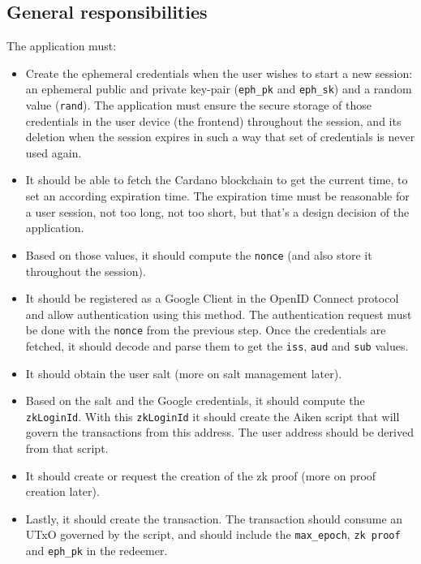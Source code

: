 \documentclass{article}
\begin{document}
\subsection{General responsibilities}
The application must:
\begin{itemize}
    \item Create the ephemeral credentials when the user wishes to start a new session: an ephemeral public and private key-pair (\texttt{eph\_pk} and \texttt{eph\_sk}) and a random value (\texttt{rand}). The application must ensure the secure storage of those credentials in the user device (the frontend) throughout the session, and its deletion when the session expires in such a way that set of credentials is never used again.
    \item It should be able to fetch the Cardano blockchain to get the current time, to set an according expiration time. The expiration time must be reasonable for a user session, not too long, not too short, but that's a design decision of the application.
    \item Based on those values, it should compute the \texttt{nonce} (and also store it throughout the session).
    \item It should be registered as a Google Client in the OpenID Connect protocol and allow authentication using this method. The authentication request must be done with the \texttt{nonce} from the previous step. Once the credentials are fetched, it should decode and parse them to get the \texttt{iss}, \texttt{aud} and \texttt{sub} values.
    \item It should obtain the user salt (more on salt management later).
    \item Based on the salt and the Google credentials, it should compute the \texttt{zkLoginId}. With this \texttt{zkLoginId} it should create the Aiken script that will govern the transactions from this address. The user address should be derived from that script.
    \item It should create or request the creation of the zk proof (more on proof creation later).
    \item Lastly, it should create the transaction. The transaction should consume an UTxO governed by the script, and should include the \texttt{max\_epoch}, \texttt{zk proof} and \texttt{eph\_pk} in the redeemer.
\end{itemize}
\end{document}
